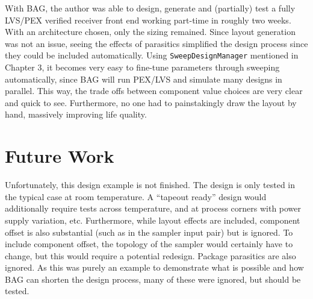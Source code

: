 With BAG, the author was able to design, generate and (partially) test a fully LVS/PEX verified receiver front end working part-time in roughly two weeks. With an architecture chosen, only the sizing remained. Since layout generation was not an issue, seeing the effects of parasitics simplified the design process since they could be included automatically. Using \texttt{SweepDesignManager} mentioned in Chapter 3, it becomes very easy to fine-tune parameters through sweeping automatically, since BAG will run PEX/LVS and simulate many designs in parallel. This way, the trade offs between component value choices are very clear and quick to see. Furthermore, no one had to painstakingly draw the layout by hand, massively improving life quality.

\section{Future Work}
Unfortunately, this design example is not finished. The design is only tested in the typical case at room temperature. A ``tapeout ready'' design would additionally require tests across temperature, and at process corners with power supply variation, etc. Furthermore, while layout effects are included, component offset is also substantial (such as in the sampler input pair) but is ignored. To include component offset, the topology of the sampler would certainly have to change, but this would require a potential redesign. Package parasitics are also ignored. As this was purely an example to demonstrate what is possible and how BAG can shorten the design process, many of these were ignored, but should be tested.

